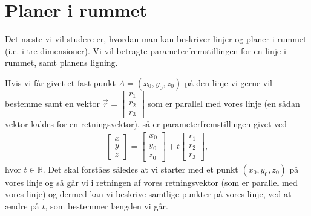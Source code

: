 \section{Planer i rummet}
\noindent Det næste vi vil studere er, hvordan man kan beskriver linjer og planer i rummet (i.e. i tre dimensioner). Vi vil betragte parameterfremstillingen for en linje i rummet, samt planens ligning.

Hvis vi får givet et fast punkt $A=(x_0,y_0,z_0)$ på den linje vi gerne vil bestemme samt en vektor $\vec{r}=\begin{bmatrix}r_1\\r_2\\r_3 \end{bmatrix}$ som er parallel med vores linje (en sådan vektor kaldes for en retningsvektor), så er parameterfremstillingen givet ved
\begin{align}\label{eq:vec3d2et}
\begin{bmatrix}x \\ y \\ z\end{bmatrix} = \begin{bmatrix}x_0 \\y_0 \\ z_0\end{bmatrix}  +t
\begin{bmatrix}r_1 \\r_2 \\ r_3 \end{bmatrix},
\end{align}
hvor $t \in \mathbb{R}$. Det skal forståes således at vi starter med et punkt $(x_0,y_0,z_0)$ på vores linje og så går vi i retningen af vores retningsvektor (som er parallel med vores linje) og dermed kan vi beskrive samtlige punkter på vores linje, ved at ændre på $t$, som bestemmer længden vi går.

